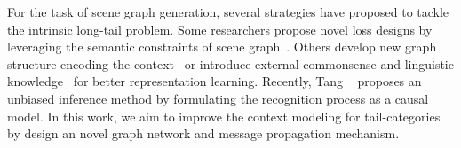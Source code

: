 For the task of scene graph generation, several strategies have proposed to tackle the intrinsic long-tail problem. Some researchers propose novel loss designs by leveraging the semantic constraints of scene graph~\cite{knyazev_graph_2020, lin_gps-net_2020, yan_pcpl_2020, wang2020tackling}.  Others develop new graph structure encoding the context~\cite{tang_learning_2018, chen_knowledge-embedded_2019, lin_gps-net_2020} or introduce external commonsense and linguistic knowledge~\cite{zareian_bridging_2020, zareian_learning_2020, peyre2019detecting} for better representation learning. Recently, Tang \etal~\cite{tang_unbiased_2020} proposes an unbiased inference method by formulating the recognition process as a causal model. In this work, we aim to improve the context modeling for tail-categories by design an novel graph network and message propagation mechanism.






